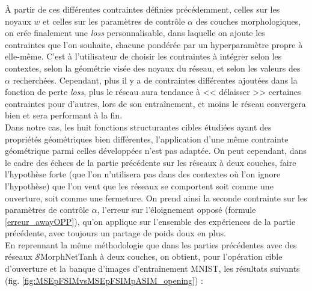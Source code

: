 À partir de ces différentes contraintes définies précédemment, celles sur les noyaux $w$ et celles sur les paramètres de contrôle $\alpha$ des couches morphologiques, on crée finalement une \textit{loss} personnalisable, dans laquelle on ajoute les contraintes que l'on souhaite, chacune pondérée par un hyperparamètre propre à elle-même. C'est à l'utilisateur de choisir les contraintes à intégrer selon les contextes, selon la géométrie visée des noyaux du réseau, et selon les valeurs des $\alpha$ recherchées. Cependant, plus il y a de contraintes différentes ajoutées dans la fonction de perte \textit{loss}, plus le réseau aura tendance à << délaisser >> certaines contraintes pour d'autres, lors de son entraînement, et moins le réseau convergera bien et sera performant à la fin. \\

\vspace{-1.6mm}
\noindent Dans notre cas, les huit fonctions structurantes cibles étudiées ayant des propriétés géométriques bien différentes, l'application d'une même contrainte géométrique parmi celles développées n'est pas adaptée. On peut cependant, dans le cadre des échecs de la partie précédente sur les réseaux à deux couches, faire l'hypothèse forte (que l'on n'utilisera pas dans des contextes où l'on ignore l'hypothèse) que l'on veut que les réseaux se comportent soit comme une ouverture, soit comme une fermeture. On prend ainsi la seconde contrainte sur les paramètres de contrôle $\alpha$, l'erreur sur l'éloignement opposé (formule \ref{erreur_awayOPP}), qu'on applique sur l'ensemble des expériences de la partie précédente, avec toujours un partage de poids doux en plus. \\

\vspace{-1.6mm}
En reprennant la même méthodologie que dans les parties précédentes avec des réseaux $\mathcal{S}$MorphNetTanh à deux couches, on obtient, pour l'opération cible d'ouverture et la banque d'images d'entraînement MNIST, les résultats suivants (fig. \ref{fig:MSEpFSIMvsMSEpFSIMpASIM_opening}) : \\

